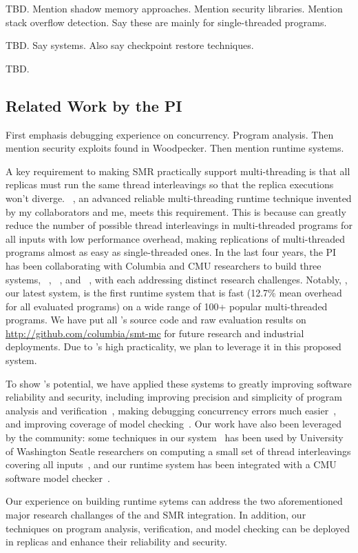  TBD.
Mention shadow memory approaches.
Mention security libraries.
Mention stack overflow detection.
Say these are mainly for single-threaded programs.

 TBD.
Say systems.
Also say checkpoint restore techniques.

 TBD.



\subsection{Related Work by the PI} \label{sec:my-work}

First emphasis debugging experience on concurrency. Program analysis.
Then mention security exploits found in Woodpecker.
Then mention runtime systems.

A key requirement to making SMR practically support multi-threading is that all 
replicas must run the same thread interleavings so that the replica executions 
won't diverge. \smt~\cite{smt:cacm}, an advanced reliable multi-threading 
runtime technique invented by my collaborators and me, meets this requirement. 
This is because \smt can greatly reduce the number of possible thread 
interleavings in multi-threaded programs for all inputs with low performance 
overhead, making replications of multi-threaded programs almost as easy as 
single-threaded ones. In the last four years, the PI has been collaborating 
with Columbia and CMU researchers to build three \smt systems, 
\tern~\cite{cui:tern:osdi10}, \peregrine~\cite{peregrine:sosp11}, and 
\parrot~\cite{parrot:sosp13}, with each addressing distinct research 
challenges. Notably, \parrot, our latest system, is the first \smt runtime 
system that is fast (12.7\% mean overhead for all evaluated programs) on a wide 
range of 100+ popular multi-threaded programs. We have 
put all \parrot's source code and raw evaluation results on 
\url{http://github.com/columbia/smt-mc} for future research and industrial 
deployments. Due to \parrot's high practicality, we plan to leverage it in this 
proposed \xxx system.

To show \smt's potential, we have applied these systems to greatly improving 
software reliability and security, including improving precision and simplicity 
of program analysis and verification~\cite{wu:pldi12}, making debugging 
concurrency errors much easier~\cite{cui:tern:osdi10}, and improving coverage 
of model checking~\cite{parrot:sosp13}. Our work have also been leveraged by 
the community: some techniques in our \tern system~\cite{cui:tern:osdi10} has 
been used by University of Washington Seatle researchers on computing a small 
set of thread interleavings covering all inputs~\cite{ics:oopsla13}, and our 
\parrot runtime system has been integrated with a CMU software model 
checker~\cite{dbug:spin11}.

Our experience on building \smt runtime sytems can address the two 
aforementioned major research challanges of the \smt and SMR integration. In 
addition, our techniques on program analysis, verification, and model checking 
can be deployed in \xxx replicas and enhance their reliability and security.


